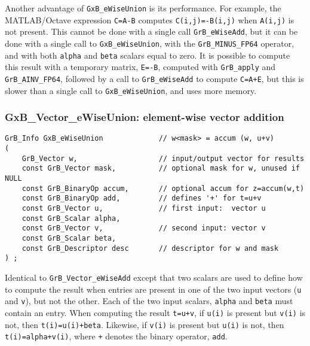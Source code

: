 \documentclass[12pt]{article}
\begin{document}
Another advantage of \verb'GxB_eWiseUnion' is its performance.  For example,
the MATLAB/Octave expression \verb'C=A-B' computes \verb'C(i,j)=-B(i,j)' when
\verb'A(i,j)' is not present.  This cannot be done with a single call
\verb'GrB_eWiseAdd', but it can be done with a single call to
\verb'GxB_eWiseUnion', with the \verb'GrB_MINUS_FP64' operator, and with both
\verb'alpha' and \verb'beta' scalars equal to zero.  It is possible to
compute this result with a temporary matrix, \verb'E=-B', computed with
\verb'GrB_apply' and \verb'GrB_AINV_FP64', followed by a call to
\verb'GrB_eWiseAdd' to compute \verb'C=A+E', but this is slower than a single
call to \verb'GxB_eWiseUnion', and uses more memory.

\newpage
\subsubsection{{\sf GxB\_Vector\_eWiseUnion:} element-wise vector addition}
\label{eWiseUnion_vector}

\begin{mdframed}[userdefinedwidth=6in]
{\footnotesize
\begin{verbatim}
GrB_Info GxB_eWiseUnion             // w<mask> = accum (w, u+v)
(
    GrB_Vector w,                   // input/output vector for results
    const GrB_Vector mask,          // optional mask for w, unused if NULL
    const GrB_BinaryOp accum,       // optional accum for z=accum(w,t)
    const GrB_BinaryOp add,         // defines '+' for t=u+v
    const GrB_Vector u,             // first input:  vector u
    const GrB_Scalar alpha,
    const GrB_Vector v,             // second input: vector v
    const GrB_Scalar beta,
    const GrB_Descriptor desc       // descriptor for w and mask
) ;
\end{verbatim} } \end{mdframed}

Identical to \verb'GrB_Vector_eWiseAdd' except that two scalars are used
to define how to compute the result when entries are present in one of
the two input vectors (\verb'u' and \verb'v'), but not the other.
Each of the two input scalars, \verb'alpha' and \verb'beta'
must contain an entry.
When computing the result \verb't=u+v',
if \verb'u(i)' is present but \verb'v(i)' is not, then \verb't(i)=u(i)+beta'.
Likewise,
if \verb'v(i)' is present but \verb'u(i)' is not, then \verb't(i)=alpha+v(i)',
where \verb'+' denotes the binary operator, \verb'add'.
\end{document}
